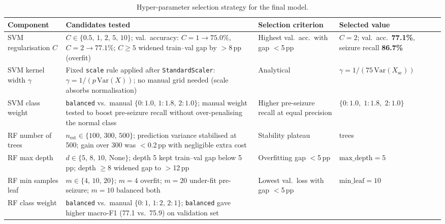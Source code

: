 \documentclass[12pt, a4paper]{report}
\begin{document}
\begin{table}[H]
  \centering
  \caption{Hyper-parameter selection strategy for the final model.}
  \label{tab:hyperparam_selection_strategy}
  \scriptsize
  \renewcommand{\arraystretch}{1.22}
  \setlength{\tabcolsep}{4pt}
  \begin{tabularx}{\textwidth}{>{\raggedright\arraybackslash}p{2.4cm}
                              >{\raggedright\arraybackslash}p{4.8cm}
                              >{\raggedright\arraybackslash}p{2.6cm}
                              >{\raggedright\arraybackslash}X}
    \toprule
    \textbf{Component} & \textbf{Candidates tested} & \textbf{Selection criterion} & \textbf{Selected value} \\
    \midrule
    SVM regularisation $C$ &
    $C \in \{0.5,\,1,\,2,\,5,\,10\}$; val.\ accuracy: $C{=}1 \to 75.0\%$, $C{=}2 \to 77.1\%$; $C{\ge}5$ widened train--val gap by $>$8\,pp (overfit) &
    Highest val.\ acc.\ with gap $<$5\,pp &
    $C = 2$; val.\ acc.\ \textbf{77.1\%}, seizure recall \textbf{86.7\%} \\
    SVM kernel width $\gamma$ &
    Fixed \texttt{scale} rule applied after \texttt{StandardScaler}: $\gamma = 1/(p\,\mathrm{Var}(X))$; no manual grid needed (scale absorbs normalisation) &
    Analytical &
    $\gamma = 1/(75\,\mathrm{Var}(X_\mathrm{sc}))$ \\
    SVM class weight &
    \texttt{balanced} vs.\ manual $\{0{:}1.0,\,1{:}1.8,\,2{:}1.0\}$; manual weight tested to boost pre-seizure recall without over-penalising the normal class &
    Higher pre-seizure recall at equal precision &
    $\{0{:}1.0,\;1{:}1.8,\;2{:}1.0\}$ \\
    RF number of trees &
    $n_\mathrm{est} \in \{100,\,300,\,500\}$; prediction variance stabilised at 500; gain over 300 was $<$0.2\,pp with negligible extra cost &
    Stability plateau &
    500 trees \\
    RF max depth &
    $d \in \{5,\,8,\,10,\,\text{None}\}$; depth 5 kept train--val gap below 5\,pp; depth ${\ge}8$ widened gap to $>$12\,pp &
    Overfitting gap $<$5\,pp &
    $\text{max\_depth} = 5$ \\
    RF min samples leaf &
    $m \in \{4,\,10,\,20\}$; $m{=}4$ overfit; $m{=}20$ under-fit pre-seizure; $m{=}10$ balanced both &
    Lowest val.\ loss with gap $<$5\,pp &
    $\text{min\_leaf} = 10$ \\
    RF class weight &
    \texttt{balanced} vs.\ manual $\{0{:}1,\,1{:}2,\,2{:}1\}$; \texttt{balanced} gave higher macro-F1 (77.1 vs.\ 75.9) on validation set &

\end{tabularx}
\end{table}
\end{document}
